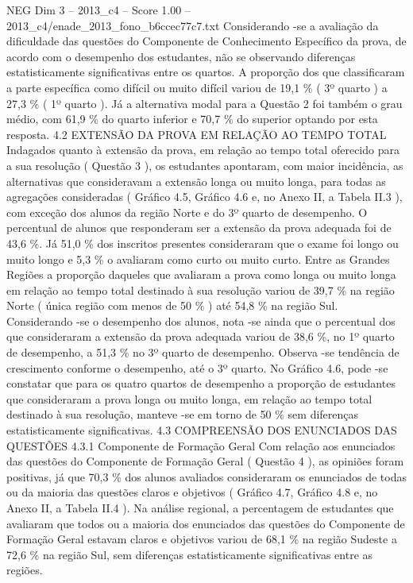 \begin{textsample}{NEG Dim 3 – 2013\_c4 – Score 1.00 – 2013\_c4/enade\_2013\_fono\_b6ccec77c7.txt}
Considerando -se a avaliação da dificuldade das questões do Componente de Conhecimento Específico da prova, de acordo com o desempenho dos estudantes, não se observando diferenças estatisticamente significativas entre os quartos.
A proporção dos que classificaram a parte específica como difícil ou muito difícil variou de 19,1 \% ( 3º quarto ) a 27,3 \% ( 1º quarto ).
Já a alternativa modal para a Questão 2 foi também o grau médio, com 61,9 \% do quarto inferior e 70,7 \% do superior optando por esta resposta. 4.2 EXTENSÃO DA PROVA EM RELAÇÃO AO TEMPO TOTAL Indagados quanto à extensão da prova, em relação ao tempo total oferecido para a sua resolução ( Questão 3 ), os estudantes apontaram, com maior incidência, as alternativas que consideravam a extensão longa ou muito longa, para todas as agregações consideradas ( Gráfico 4.5, Gráfico 4.6 e, no Anexo II, a Tabela II.3 ), com exceção dos alunos da região Norte e do 3º quarto de desempenho.
O percentual de alunos que responderam ser a extensão da prova adequada foi de 43,6 \%.
Já 51,0 \% dos inscritos presentes consideraram que o exame foi longo ou muito longo e 5,3 \% o avaliaram como curto ou muito curto.
Entre as Grandes Regiões a proporção daqueles que avaliaram a prova como longa ou muito longa em relação ao tempo total destinado à sua resolução variou de 39,7 \% na região Norte ( única região com menos de 50 \% ) até 54,8 \% na região Sul.
Considerando -se o desempenho dos alunos, nota -se ainda que o percentual dos que consideraram a extensão da prova adequada variou de 38,6 \%, no 1º quarto de desempenho, a 51,3 \% no 3º quarto de desempenho.
Observa -se tendência de crescimento conforme o desempenho, até o 3º quarto.
No Gráfico 4.6, pode -se constatar que para os quatro quartos de desempenho a proporção de estudantes que consideraram a prova longa ou muito longa, em relação ao tempo total destinado à sua resolução, manteve -se em torno de 50 \% sem diferenças estatisticamente significativas. 4.3 COMPREENSÃO DOS ENUNCIADOS DAS QUESTÕES 4.3.1 Componente de Formação Geral Com relação aos enunciados das questões do Componente de Formação Geral ( Questão 4 ), as opiniões foram positivas, já que 70,3 \% dos alunos avaliados consideraram os enunciados de todas ou da maioria das questões claros e objetivos ( Gráfico 4.7, Gráfico 4.8 e, no Anexo II, a Tabela II.4 ).
Na análise regional, a percentagem de estudantes que avaliaram que todos ou a maioria dos enunciados das questões do Componente de Formação Geral estavam claros e objetivos variou de 68,1 \% na região Sudeste a 72,6 \% na região Sul, sem diferenças estatisticamente significativas entre as regiões.

\end{textsample}

